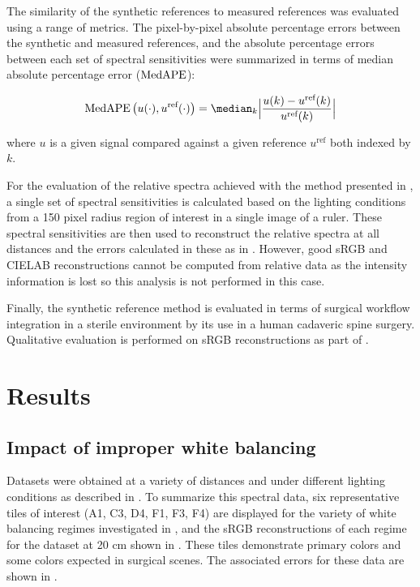 The similarity of the synthetic references to measured references was evaluated using a range of metrics.
The pixel-by-pixel absolute percentage errors between the synthetic and measured references, and the absolute percentage errors between each set of spectral sensitivities were summarized in terms of median absolute percentage error ($\operatorname{MedAPE}$):
% 
%
\begin{linenomath*}
\begin{equation}
    \MedAPE\big(u(\cdot),u^{\textrm{ref}}(\cdot)\big) = \median_{k}\Big|\frac{u(k) - u^{\textrm{ref}}(k)}{u^{\textrm{ref}}(k)}\Big|
\label{eq:abspercenterr}
\end{equation}
\end{linenomath*}
where $u$ is a given signal compared against a given reference $u^{\textrm{ref}}$ both indexed by $k$.


For the evaluation of the relative spectra achieved with the method presented in ,
a single set of spectral sensitivities is calculated based on the lighting conditions from a 150 pixel radius region of interest in a single image of a ruler.
%
These spectral sensitivities are then used to reconstruct the relative spectra at all distances and the errors calculated in these as in .
However, good sRGB and CIELAB reconstructions cannot be computed from relative data as the intensity information is lost so this analysis is not performed in this case.

Finally, the synthetic reference method is evaluated in terms of surgical workflow integration in a sterile environment by its use in a human cadaveric spine surgery. Qualitative evaluation is performed on sRGB reconstructions as part of .
%

\section{Results}
\label{results}
\subsection{Impact of improper white balancing}%
\label{resultsnecessity}
Datasets were obtained at a variety of distances and under different lighting conditions as described in . 
% 
%
To summarize this spectral data, six representative tiles of interest (A1, C3, D4, F1, F3, F4) are displayed for the variety of white balancing regimes investigated in , and the sRGB reconstructions of each regime for the dataset at 20 cm shown in . These tiles demonstrate primary colors and some colors expected in surgical scenes. The associated errors for these data are shown in . 

